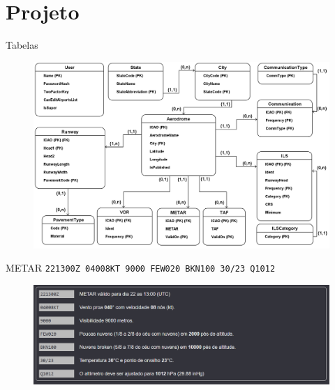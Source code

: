 \documentclass{beamer}
\begin{document}
\section{Projeto}

\begin{frame}{Tabelas}
    \begin{figure}[ht]
        \begin{center}
        \includegraphics[width=0.8\linewidth]{img/ERAero.png}
        \label{fig:arquitetura}
        \end{center}
    \end{figure}
\end{frame}

\begin{frame}{METAR}
    \centering
    \small{\texttt{221300Z 04008KT 9000 FEW020 BKN100 30/23 Q1012}}
    \begin{figure}[ht]
        \begin{center}
        \includegraphics[width=0.8\linewidth]{img/METAR-SBBE.png}
        \label{fig:UI}
        \end{center}
    \end{figure}
\end{frame}
\end{document}
